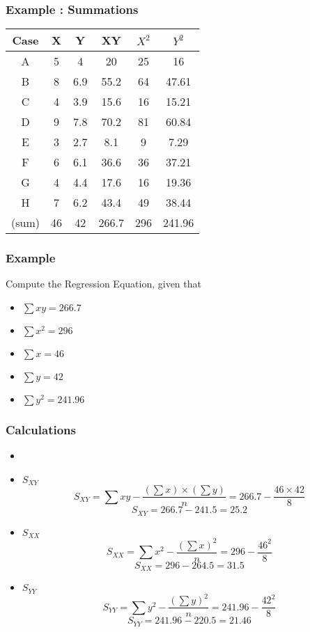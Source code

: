 \documentclass[a4]{beamer}
\begin{document}
\begin{frame}
\frametitle{Example : Summations}
\begin{center}
\begin{tabular}{|c|c|c|c|c|c|}
  \hline
	Case &	X	&	Y	&	XY	&	$X^2$	&	$Y^2$	\\  \hline
A	&	5	&	4	&	20	&	25	&	16	\\
B	&	8	&	6.9	&	55.2	&	64	&	47.61	\\
C	&	4	&	3.9	&	15.6	&	16	&	15.21	\\
D	&	9	&	7.8	&	70.2	&	81	&	60.84	\\
E	&	3	&	2.7	&	8.1	&	9	&	7.29	\\
F	&	6	&	6.1	&	36.6	&	36	&	37.21	\\
G	&	4	&	4.4	&	17.6	&	16	&	19.36	\\
H	&	7	&	6.2	&	43.4	&	49	&	38.44	\\ \hline
(sum)	&	46	&	42	&	266.7	&	296	&	241.96	\\ \hline
\end{tabular}
\end{center}
\end{frame}

\begin{frame}
\frametitle{Example}
Compute the Regression Equation, given that
\begin{itemize}
\item $\sum xy = 266.7 $
\item $\sum x^2 = 296 $
\item $\sum x = 46$	
\item $\sum y =  42$	
\item $\sum y^2 = 241.96$
\end{itemize}
\end{frame}
\begin{frame}
\frametitle{Calculations}
\begin{itemize}
\item\item $S_{XY}$
\[ S_{XY} = \sum xy - \frac{(\sum x)\times (\sum y)}{n} = 266.7 - \frac{46 \times 42}{8} \]
\[ S_{XY} = 266.7-241.5  = 25.2 \]
\item $S_{XX}$
\[ S_{XX} = \sum x^2 - \frac{(\sum x)^2}{n} = 296 - \frac{46 ^2}{8}\]
\[ S_{XX} = 296 - 264.5 = 31.5 \]

\item $S_{YY}$
\[ S_{YY} = \sum y^2 - \frac{(\sum y)^2}{n} = 241.96- \frac{42^2}{8} \]
\[ S_{YY} = 241.96 - 220.5 =  21.46 \]
\end{itemize}
\end{frame}
\end{document}

